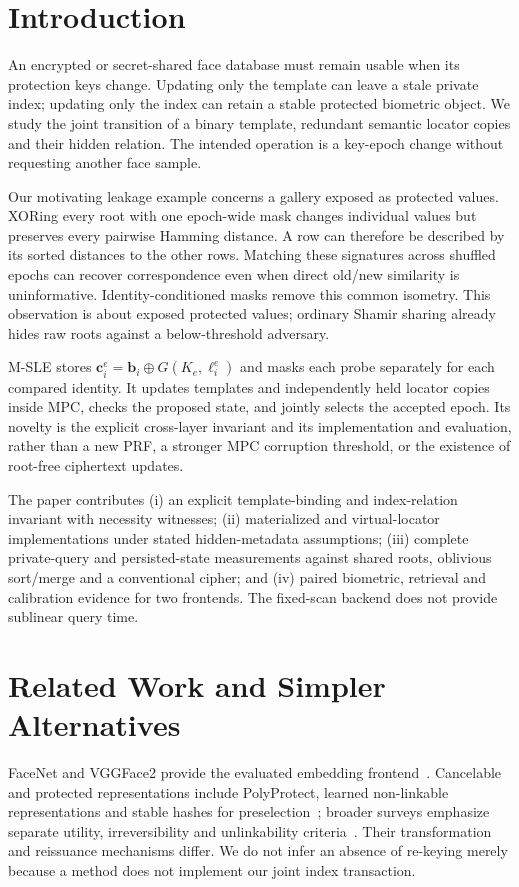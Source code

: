 \documentclass[journal]{IEEEtran}
\newcommand{\MSLE}{\textsc{M-SLE}\xspace}
\begin{document}
\section{Introduction}
An encrypted or secret-shared face database must remain usable when its protection keys change. Updating only the template can leave a stale private index; updating only the index can retain a stable protected biometric object. We study the joint transition of a binary template, redundant semantic locator copies and their hidden relation. The intended operation is a key-epoch change without requesting another face sample.

Our motivating leakage example concerns a gallery exposed as protected values. XORing every root with one epoch-wide mask changes individual values but preserves every pairwise Hamming distance. A row can therefore be described by its sorted distances to the other rows. Matching these signatures across shuffled epochs can recover correspondence even when direct old/new similarity is uninformative. Identity-conditioned masks remove this common isometry. This observation is about exposed protected values; ordinary Shamir sharing already hides raw roots against a below-threshold adversary.

\MSLE stores $\mathbf c_i^e=\mathbf b_i\oplus G(K_e,\ell_i^e)$ and masks each probe separately for each compared identity. It updates templates and independently held locator copies inside MPC, checks the proposed state, and jointly selects the accepted epoch. Its novelty is the explicit cross-layer invariant and its implementation and evaluation, rather than a new PRF, a stronger MPC corruption threshold, or the existence of root-free ciphertext updates.

The paper contributes (i) an explicit template-binding and index-relation invariant with necessity witnesses; (ii) materialized and virtual-locator implementations under stated hidden-metadata assumptions; (iii) complete private-query and persisted-state measurements against shared roots, oblivious sort/merge and a conventional cipher; and (iv) paired biometric, retrieval and calibration evidence for two frontends. The fixed-scan backend does not provide sublinear query time.

\section{Related Work and Simpler Alternatives}
FaceNet and VGGFace2 provide the evaluated embedding frontend~\cite{schroff2015facenet,cao2018vggface2}. Cancelable and protected representations include PolyProtect, learned non-linkable representations and stable hashes for preselection~\cite{hahn2022polyprotect,pinto2021securetriplet,osorioroig2022stablehash}; broader surveys emphasize separate utility, irreversibility and unlinkability criteria~\cite{krivokuca2023survey}. Their transformation and reissuance mechanisms differ. We do not infer an absence of re-keying merely because a method does not implement our joint index transaction.
\end{document}
